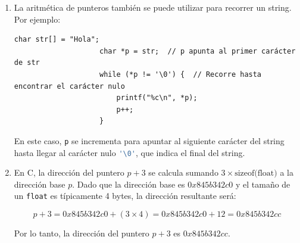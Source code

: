 \documentclass[12pt]{article}
\begin{document}
\begin{enumerate}
\begin{enumerate}[label*=\arabic*.]
                \item La aritmética de punteros también se puede utilizar para recorrer un string. Por ejemplo:
                \begin{lstlisting}[xleftmargin=-12.1em, inputencoding=utf8]
                    char str[] = "Hola";
                    char *p = str;  // p apunta al primer carácter de str
                    while (*p != '\0') {  // Recorre hasta encontrar el carácter nulo
                        printf("%c\n", *p);
                        p++;
                    }
                \end{lstlisting}
                En este caso, \lstinline[language=C]|p| se incrementa para apuntar al siguiente carácter del string hasta llegar al carácter nulo \lstinline[language=C]|'\0'|, que indica el final del string. 
                
                \item En C, la dirección del puntero $p+3$ se calcula sumando $3 \times \text{sizeof(float)}$ a la dirección base $p$. Dado que la dirección base es $0x845b342c0$ y el tamaño de un \texttt{float} es típicamente 4 bytes, la dirección resultante será:

                \[
                p+3 = 0x845b342c0 + (3 \times 4) = 0x845b342c0 + 12 = 0x845b342cc
                \]

                Por lo tanto, la dirección del puntero $p+3$ es $0x845b342cc$.
            \end{enumerate}


\end{enumerate}
\end{document}
